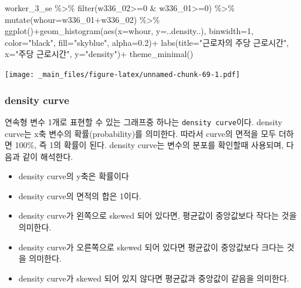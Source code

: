 \documentclass[
]{book}
\newenvironment{Shaded}{\begin{snugshade}}{\end{snugshade}}
\newcommand{\AttributeTok}[1]{\textcolor[rgb]{0.77,0.63,0.00}{#1}}
\newcommand{\DecValTok}[1]{\textcolor[rgb]{0.00,0.00,0.81}{#1}}
\newcommand{\FloatTok}[1]{\textcolor[rgb]{0.00,0.00,0.81}{#1}}
\newcommand{\FunctionTok}[1]{\textcolor[rgb]{0.00,0.00,0.00}{#1}}
\newcommand{\NormalTok}[1]{#1}
\newcommand{\SpecialCharTok}[1]{\textcolor[rgb]{0.00,0.00,0.00}{#1}}
\newcommand{\StringTok}[1]{\textcolor[rgb]{0.31,0.60,0.02}{#1}}
\providecommand{\tightlist}{%
  \setlength{\itemsep}{0pt}\setlength{\parskip}{0pt}}
\theoremstyle{definition}
\theoremstyle{definition}
\theoremstyle{definition}
\theoremstyle{definition}
\theoremstyle{remark}
\begin{document}
\begin{Shaded}
\begin{Highlighting}[]
\NormalTok{worker\_3\_se }\SpecialCharTok{\%\textgreater{}\%} 
  \FunctionTok{filter}\NormalTok{(w336\_02}\SpecialCharTok{\textgreater{}=}\DecValTok{0} \SpecialCharTok{\&}\NormalTok{ w336\_01}\SpecialCharTok{\textgreater{}=}\DecValTok{0}\NormalTok{) }\SpecialCharTok{\%\textgreater{}\%} 
  \FunctionTok{mutate}\NormalTok{(}\AttributeTok{whour=}\NormalTok{w336\_01}\SpecialCharTok{+}\NormalTok{w336\_02) }\SpecialCharTok{\%\textgreater{}\%} 
  \FunctionTok{ggplot}\NormalTok{()}\SpecialCharTok{+}\FunctionTok{geom\_histogram}\NormalTok{(}\FunctionTok{aes}\NormalTok{(}\AttributeTok{x=}\NormalTok{whour, }\AttributeTok{y=}\NormalTok{..density..), }\AttributeTok{binwidth=}\DecValTok{1}\NormalTok{, }\AttributeTok{color=}\StringTok{"black"}\NormalTok{, }\AttributeTok{fill=}\StringTok{"skyblue"}\NormalTok{, }\AttributeTok{alpha=}\FloatTok{0.2}\NormalTok{)}\SpecialCharTok{+}
  \FunctionTok{labs}\NormalTok{(}\AttributeTok{title=}\StringTok{"근로자의 주당 근로시간"}\NormalTok{, }\AttributeTok{x=}\StringTok{"주당 근로시간"}\NormalTok{, }\AttributeTok{y=}\StringTok{"density"}\NormalTok{)}\SpecialCharTok{+}
  \FunctionTok{theme\_minimal}\NormalTok{()}
\end{Highlighting}
\end{Shaded}

\texttt{[image: \_main\_files/figure-latex/unnamed-chunk-69-1.pdf]}

\hypertarget{density-curve}{%
\subsubsection{density curve}\label{density-curve}}

연속형 변수 1개로 표현할 수 있는 그래프중 하나는 \texttt{density\ curve}이다. density curve는 x축 변수의 확률(probability)를 의미한다. 따라서 curve의 면적을 모두 더하면 100\%, 즉 1의 확률이 된다. density curve는 변수의 분포를 확인할때 사용되며, 다음과 같이 해석한다.

\begin{itemize}
\tightlist
\item
  density curve의 y축은 확률이다
\item
  density curve의 면적의 합은 1이다.
\item
  density curve가 왼쪽으로 skewed 되어 있다면, 평균값이 중앙값보다 작다는 것을 의미한다.
\item
  density curve가 오른쪽으로 skewed 되어 있다면 평균값이 중앙값보다 크다는 것을 의미한다.
\item
  density curve가 skewed 되어 있지 않다면 평균값과 중앙값이 같음을 의미한다.
\end{itemize}
\end{document}
